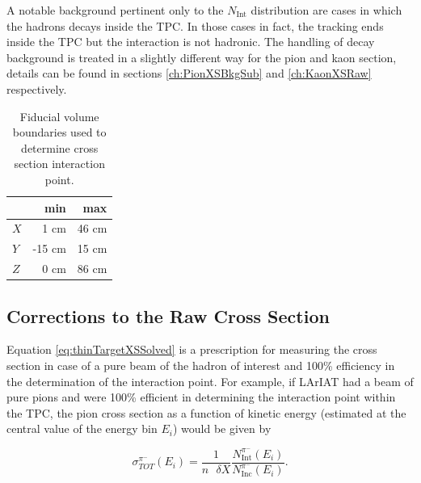  A notable background pertinent only to the $N_{\text{Int}}$  distribution are cases in which the hadrons decays inside the TPC. In those cases in fact, the tracking ends inside the TPC but the interaction is not hadronic. The handling of decay background is treated in a slightly different way for the pion and kaon section, details can be found in sections \ref{ch:PionXSBkgSub} and \ref{ch:KaonXSRaw} respectively.



\begin{table}[t]
\centering
\begin{tabular}{|l|r|r|}
\hline
& min   &  max  \\ \hline
$X$ & 1 cm   & 46 cm  \\ \hline
$Y$ & -15 cm   & 15  cm  \\ \hline
$Z$ & 0 cm   & 86 cm  \\ \hline
\end{tabular}
\caption{Fiducial volume boundaries used to determine cross section interaction point. }
\label{tab:FidVol}
\end{table}



\subsection{Corrections to the Raw Cross Section}\label{ch:MCCorrections}
Equation \ref{eq:thinTargetXSSolved}  is a prescription for measuring the cross section in case of a pure beam of the hadron of interest and 100\% efficiency in the determination of the interaction point.  For example, if LArIAT had a beam of pure pions and were 100\% efficient in determining the interaction point within the TPC, the pion cross section as a function of  kinetic energy (estimated at the central value of the energy bin $E_i$) would be given by

\begin{equation}
 \sigma^{\pi^-}_{TOT}(E_{i})  = \frac{1}{n\text{ } \delta X}\frac{N^{\pi^-}_{ \text{Int}} (E_{i})}{N^{\pi^-}_{ \text{Inc}}(E_{i})}.
\label{eq:thinTargetXSSolved2}
\end{equation}

